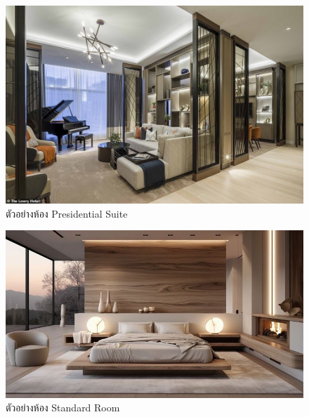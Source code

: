 \documentclass{report}
\begin{document}
\begin{figure}
    \centering
    \includegraphics[scale=0.2]{Presidential.jpg}
    \caption{ตัวอย่างห้อง Presidential Suite}
    \label{fig:graph8}
\end{figure}

\begin{figure}
    \centering
    \includegraphics[scale=0.2]{Standard.jpg}
    \caption{ตัวอย่างห้อง Standard Room}
    \label{fig:graph9}
\end{figure}
\end{document}
